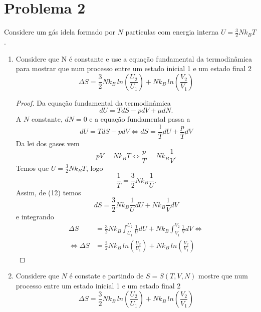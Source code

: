 \documentclass[12pt, twoside, a4paper]{article}
\begin{document}
\section{Problema 2}
Considere um gás idela formado por $N$ partículas com energia interna $U=\frac{3}{2}Nk_BT$.
\begin{enumerate}[1.]
  \item Considere que N é constante e use a equação fundamental da termodinâmica para mostrar que num processo entre um estado inicial 1 e um estado final 2
  \begin{equation}
    \Delta S=\frac{3}{2}Nk_B\,ln(\frac{U_2}{U_1})+Nk_B\,ln(\frac{V_2}{V_1})
  \end{equation}
  \begin{proof}
    Da equação fundamental da termodinâmica
    \begin{equation}
      dU=TdS-pdV+\mu dN.
    \end{equation}
    A $N$ constante, $dN=0$ e a equação fundamental passa a
    \begin{equation}
      dU=TdS-pdV \iff dS=\frac{1}{T}dU+\frac{p}{T}dV
    \end{equation}
    Da lei dos gases vem
    \begin{equation}
      pV=Nk_BT \iff \frac{p}{T} = Nk_B\frac{1}{V}.
    \end{equation}
    Temos que $U=\frac{3}{2}Nk_BT$, logo
    \begin{equation}
      \frac{1}{T}=\frac{3}{2}Nk_B\frac{1}{U}.
    \end{equation}
    Assim, de (12) temos
    \begin{equation}
      dS = \frac{3}{2}Nk_B\frac{1}{U}dU+Nk_B\frac{1}{V}dV
    \end{equation}
    e integrando
    \begin{equation}
      \begin{split}
      \Delta S&=\frac{3}{2}Nk_B \int_{U_1}^{U_2}\frac{1}{U}dU + Nk_B \int_{V_1}^{V_2}\frac{1}{V}dV \iff \\
      \iff \Delta S&=\frac{3}{2}Nk_B\,ln(\frac{U_2}{U_1})+Nk_B\,ln(\frac{V_2}{V_1})
      \end{split}
    \end{equation}
  \end{proof}
  \item
  Considere que $N$ é constate e partindo de $S=S(T,V,N)$ mostre que num processo entre um estado inicial 1 e um estado final 2
  \begin{equation}
    \Delta S=\frac{3}{2}Nk_B\,ln(\frac{U_2}{U_1})+Nk_B\,ln(\frac{V_2}{V_1})

\end{equation}
\end{enumerate}
\end{document}
